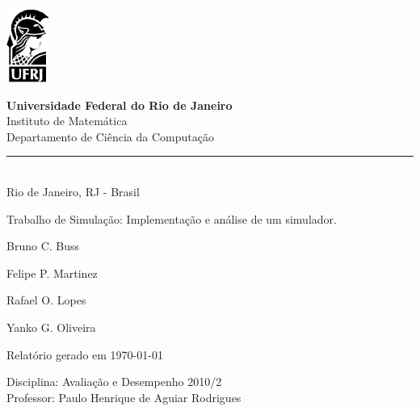 \documentclass[a4paper,10pt]{article}
\begin{document}
\begin{titlepage}

\begin{minipage}{0.2\linewidth}
 \includegraphics[]{./minerva.png}
\end{minipage}
\begin{minipage}{0.8\linewidth}
 \textbf{Universidade Federal do Rio de Janeiro}\\
 Instituto de Matemática\\
 Departamento de Ciência da Computação\\
 \rule{0.8\linewidth}{0.5mm}\\
 Rio de Janeiro, RJ - Brasil
\end{minipage}

\begin{center}

\vspace{2cm}

\Large
Trabalho de Simulação: Implementação e análise de um simulador.

\vspace{1cm}

\large

Bruno C. Buss

\vspace{0.5cm}

Felipe P. Martinez

\vspace{0.5cm}

Rafael O. Lopes

\vspace{0.5cm}

Yanko G. Oliveira

\vspace{1.5cm}

Relatório gerado em \today

\normalsize
\end{center}

\vfill

\begin{flushright}
Disciplina: Avaliação e Desempenho 2010/2\\
Professor: Paulo Henrique de Aguiar Rodrigues\\
\end{flushright}

\vspace{2cm}

\end{titlepage}
\end{document}
